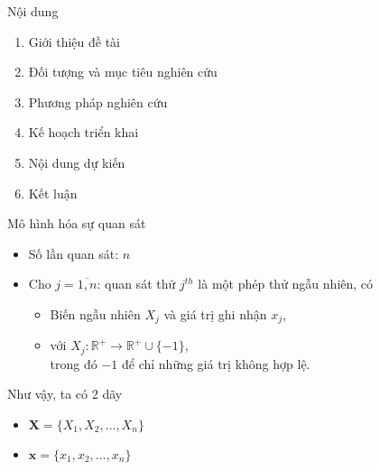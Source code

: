 \documentclass{beamer}
\begin{document}
\begin{frame}{Nội dung}
\begin{enumerate}
\item Giới thiệu đề tài
\item {\color{red}Đối tượng và mục tiêu nghiên cứu}
\item Phương pháp nghiên cứu
\item Kế hoạch triển khai
\item Nội dung dự kiến
\item Kết luận
\end{enumerate}
\end{frame}

\begin{frame}{Mô hình hóa sự quan sát}
	\begin{itemize}
	\item Số lần quan sát: \(n\)
	\item Cho \(j = \overline{1, n}\): quan sát thứ \(j^{th}\) là một phép thử ngẫu nhiên, có
		\begin{itemize}
		\item Biến ngẫu nhiên \(X_j\) và giá trị ghi nhận \(x_j\),
		\item với \(X_j: \mathbb{R}^+ \to \mathbb{R}^+ \cup \{-1\}\),\\
		 trong đó \(-1\) để chỉ những giá trị không hợp lệ.
		\end{itemize}
	\end{itemize}
Như vậy, ta có \(2\) dãy
	\begin{itemize}
	\item \(\mathbf{X} = \{X_1, X_2, \ldots, X_n\}\)
	\item \(\mathbf{x} = \{x_1, x_2, \ldots, x_n\}\)
	\end{itemize}
\end{frame}
\end{document}
